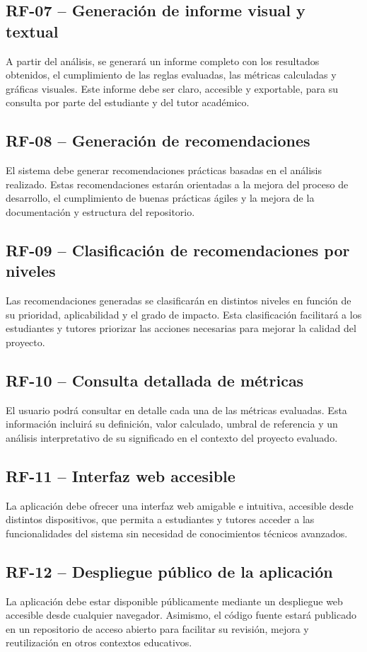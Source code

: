 \subsection*{RF-07 – Generación de informe visual y textual}

A partir del análisis, se generará un informe completo con los resultados obtenidos, el cumplimiento de las reglas evaluadas, las métricas calculadas y gráficas visuales. Este informe debe ser claro, accesible y exportable, para su consulta por parte del estudiante y del tutor académico.

\subsection*{RF-08 – Generación de recomendaciones}

El sistema debe generar recomendaciones prácticas basadas en el análisis realizado. Estas recomendaciones estarán orientadas a la mejora del proceso de desarrollo, el cumplimiento de buenas prácticas ágiles y la mejora de la documentación y estructura del repositorio.

\subsection*{RF-09 – Clasificación de recomendaciones por niveles}

Las recomendaciones generadas se clasificarán en distintos niveles en función de su prioridad, aplicabilidad y el grado de impacto. Esta clasificación facilitará a los estudiantes y tutores priorizar las acciones necesarias para mejorar la calidad del proyecto.

\subsection*{RF-10 – Consulta detallada de métricas}

El usuario podrá consultar en detalle cada una de las métricas evaluadas. Esta información incluirá su definición, valor calculado, umbral de referencia y un análisis interpretativo de su significado en el contexto del proyecto evaluado.

\subsection*{RF-11 – Interfaz web accesible}

La aplicación debe ofrecer una interfaz web amigable e intuitiva, accesible desde distintos dispositivos, que permita a estudiantes y tutores acceder a las funcionalidades del sistema sin necesidad de conocimientos técnicos avanzados.

\subsection*{RF-12 – Despliegue público de la aplicación}

La aplicación debe estar disponible públicamente mediante un despliegue web accesible desde cualquier navegador. Asimismo, el código fuente estará publicado en un repositorio de acceso abierto para facilitar su revisión, mejora y reutilización en otros contextos educativos.